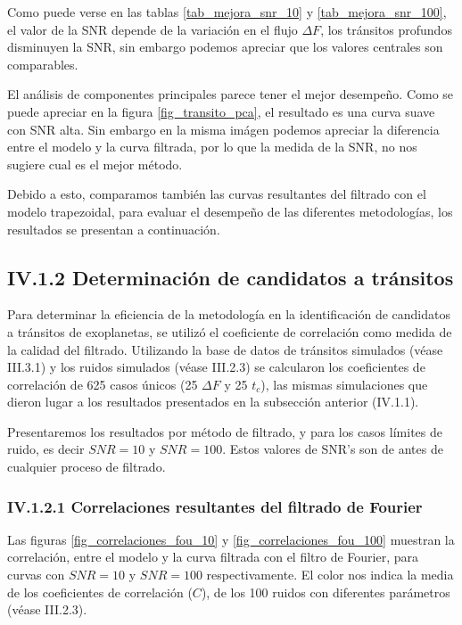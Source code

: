 Como puede verse en las tablas \ref{tab_mejora_snr_10} y \ref{tab_mejora_snr_100}, el valor de la SNR depende de la variación en el flujo $\Delta F$, los tránsitos profundos disminuyen la SNR, sin embargo podemos apreciar que los valores centrales son comparables.

El análisis de componentes principales parece tener el mejor desempeño. Como se puede apreciar en la figura \ref{fig_transito_pca}, el resultado es una curva suave con SNR alta. Sin embargo en la misma imágen podemos apreciar la diferencia entre el modelo y la curva filtrada, por lo que la medida de la SNR, no nos sugiere cual es el mejor método.

Debido a esto, comparamos también las curvas resultantes del filtrado con el modelo trapezoidal, para evaluar el desempeño de las diferentes metodologías, los resultados se presentan a continuación.

\subsection*{IV.1.2 Determinación de candidatos a tránsitos}

Para determinar la eficiencia de la metodología en la identificación de candidatos a tránsitos de exoplanetas, se utilizó el coeficiente de correlación como medida de la calidad del filtrado. Utilizando la base de datos de tránsitos simulados (véase III.3.1) y los ruidos simulados (véase III.2.3) se calcularon los coeficientes de correlación de 625 casos únicos (25 $\Delta F$ y 25 $t_{c}$), las mismas simulaciones que dieron lugar a los resultados presentados en la subsección anterior (IV.1.1).

Presentaremos los resultados por método de filtrado, y para los casos límites de ruido, es decir $SNR=10$ y $SNR=100$. Estos valores de SNR's son de antes de cualquier proceso de filtrado.

\subsubsection*{IV.1.2.1 Correlaciones resultantes del filtrado de Fourier}

Las figuras \ref{fig_correlaciones_fou_10} y \ref{fig_correlaciones_fou_100} muestran la correlación, entre el modelo y la curva filtrada con el filtro de Fourier, para curvas con $SNR=10$ y $SNR=100$ respectivamente. El color nos indica la media de los coeficientes de correlación ($C$), de los 100 ruidos con diferentes parámetros (véase III.2.3).

